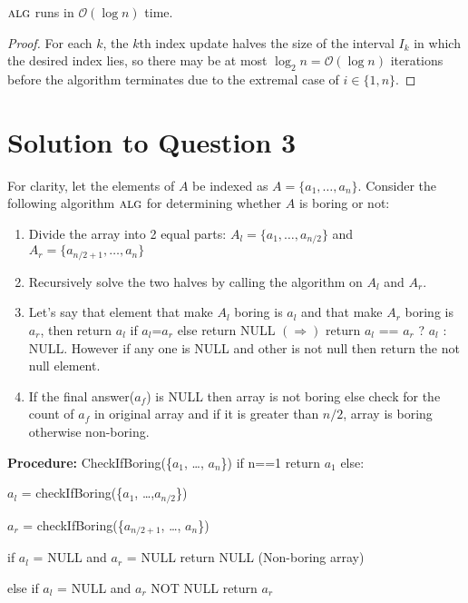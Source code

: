 \documentclass[11pt]{article}
\renewcommand{\O}{\mathcal{O}}
\newcommand{\alg}{\textsc{alg}}
\begin{document}
 $\alg$ runs in $\O(\log n)$ time.

\begin{proof}
  For each $k$, the $k$th index update halves the size of the interval $I_k$ in which the desired index lies, so there may be at most $\log_{2}n = \O(\log n)$ iterations before the algorithm terminates due to the extremal case of $i \in \{1, n\}$.
\end{proof}

\section{Solution to Question 3}

For clarity, let the elements of $A$ be indexed as $A = \{a_1, \dots, a_n\}$.
Consider the following algorithm $\alg$ for determining whether $A$ is boring or not:
\begin{enumerate}
  \item Divide the array into 2 equal parts: $A_l = \{a_1, \dots, a_{n/2}\}$ and $A_r = \{a_{n/2+1}, \dots, a_n\}$
  \item Recursively solve the two halves by calling the algorithm on $A_l$ and $A_r$.
  \item Let's say that element that make $A_l$ boring is $a_l$ and that make $A_r$ boring is $a_r$, then return $a_l$ if $a_l$=$a_r$ else
return NULL \newline
  $(\Rightarrow)$ return $a_l$ == $a_r$ ? $a_l$ : NULL.
However if any one is NULL and other is not null then return the not null element.
\item If the final answer($a_f$) is NULL then array is not boring else check for the count of $a_f$ in original array and if it is greater than
$n/2$, array is boring otherwise non-boring.
\end{enumerate}
{\bf Procedure:}\newline
CheckIfBoring(\{$a_1$, \dots, $a_n$\}) \newline
if n==1 return $a_1$ \newline
\newline
else:

 $a_l$ = checkIfBoring(\{$a_1$, \dots,$a_{n/2}$\})

 $a_r$ = checkIfBoring(\{$a_{n/2+1}$, \dots, $a_n$\})

 if $a_l$ = NULL and $a_r$ = NULL return NULL (Non-boring array)

else if $a_l$ = NULL and $a_r$ NOT NULL return $a_r$
\end{document}
